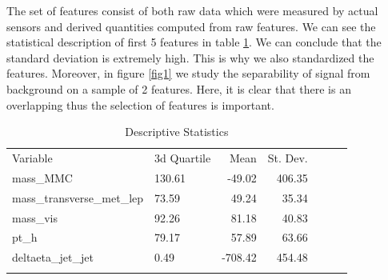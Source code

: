 \documentclass[10pt,conference,compsocconf]{IEEEtran}
\begin{document}
The set of features consist of both raw data which were measured by actual sensors and derived quantities computed from raw features. We can see the statistical description of first 5 features in table \ref{Table2}. We can conclude that the standard deviation is extremely high. This is why we also standardized the features. Moreover, in figure \ref{fig1} we study the separability of signal from background on a sample of 2 features. Here, it is clear that there is an overlapping thus the selection of features is important. 

\begin{table}[htb]	\label{Table2}
	\addtolength\tabcolsep{2pt}
	\caption{Descriptive Statistics}
	\addtolength\tabcolsep{2pt}
	\begin{tabular}{llrrrrr}
		\hline\noalign{\smallskip}
		Variable 	& 3d Quartile & Mean & St. Dev. \\
		\noalign{\smallskip}\hline\noalign{\smallskip}
mass_MMC   				&  130.61	 & -49.02 &406.35 \\
mass_transverse_met_lep	 	& 73.59 	& 49.24 &35.34 \\                        
mass_vis						 	&92.26 & 81.18 & 40.83\\                        
pt_h							& 79.17		& 57.89 & 63.66\\
deltaeta_jet_jet			 	&0.49		& -708.42 & 454.48 \\                         
		\noalign{\smallskip}\hline\noalign{\smallskip}\\
	\end{tabular}
\end{table}
\end{document}
